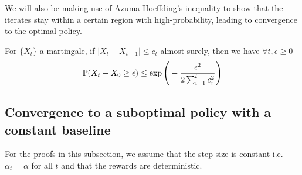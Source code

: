 We will also be making use of Azuma-Hoeffding's inequality to show that the iterates stay within a certain region with high-probability, leading to convergence to the optimal policy.
\begin{lemma}
For $\{ X_t \}$ a martingale, if
$|X_t - X_{t-1}| \le c_t$ almost surely, then we have $\forall t, \epsilon \ge 0$
$${\mathbb{P}}(X_t - X_0 \ge \epsilon) \le \exp\Bigg( -\frac{\epsilon^2}{2\sum_{i=1}^t c_i^2}\Bigg)$$
\end{lemma}

\subsection{Convergence to a suboptimal policy with a constant baseline}
\label{app:2arm_constant_baseline_div}
For the proofs in this subsection, we assume that the step size is constant i.e. $\alpha_t = \alpha$ for all $t$ and that the rewards are deterministic. 

\divtwoarms*


